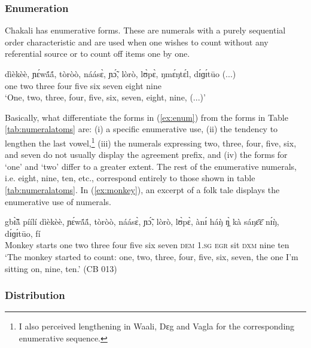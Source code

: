 \begin{exe}
\begin{exe}
\begin{exe}
{\begin{exe}
\begin{exe}
\begin{exe}
\begin{exe}
\begin{exe}
\begin{exe}
\begin{exe}
\begin{exe}
\begin{exe}
\subsubsection{Enumeration}
\label{sec:NUM-enum}

Chakali has enumerative forms. These  are numerals
with a purely sequential order characteristic and are used when one wishes
to count without 
any referential source or  to count off items one by one.

 \ea\label{ex:enum}
\gll dìèkèè, ɲɛ́wã́ã́, tòròò,  náásɛ̀,  ɲɔ̃́, lòrò, lʊ̀pɛ̀, 
ŋmɛ́ŋtɛ́l, dɪ́ɡɪ́tūo   (...)\\
one two three four five six seven eight nine {} \\
\glt `One,  two, three, four, five, six, seven,  eight, nine,  (...)' \\
\z

Basically, 
what
differentiate the forms in (\ref{ex:enum}) from  the forms in  Table \ref{tab:numeralatoms} are: 
(i) a specific enumerative use, (ii) the tendency to lengthen the last
vowel,\footnote{I also perceived lengthening  in Waali, Dɛg and
Vagla for the
corresponding enumerative
sequence.} (iii)  the numerals  expressing two, three, four, five,
six, and seven do not usually display the agreement prefix,  and
(iv) the forms for `one'
and `two' differ to a greater extent. The rest of the enumerative numerals, i.e. eight, nine, ten, 
etc., 
correspond entirely to those shown in table
\ref{tab:numeralatoms}.  In (\ref{ex:monkey}), an excerpt of a folk tale
displays the
enumerative use of numerals.

\begin{exe}
 \ex\label{ex:monkey}

\gll gbɪ̃̀ã́  píílí dìèkèè, ɲɛ́wã́ã́, tòròò,  náásɛ̀,  ɲɔ̃́, lòrò, lʊ̀pɛ̀, ànɪ́ 
háŋ̀ ŋ̩̀ kà sáŋɛ̄ɛ̄ nɪ́ŋ̀, dɪ́ɡɪ́tūo, fí\\
Monkey starts one two three four five six seven {\conn}  \textsc{dem}
\textsc{1.sg}
\textsc{egr} sit  \textsc{dxm} nine ten\\

\glt `The monkey started to count: one, two, three, four, five, six, seven, the
one I'm sitting on, nine, ten.' (CB 013)
\end{exe}



\subsubsection{Distribution}
\label{sec:NUM-distri}


\end{exe}
\end{exe}
\end{exe}
\end{exe}
\end{exe}
\end{exe}
\end{exe}
\end{exe}
\end{exe}}
\end{exe}
\end{exe}
\end{exe}
